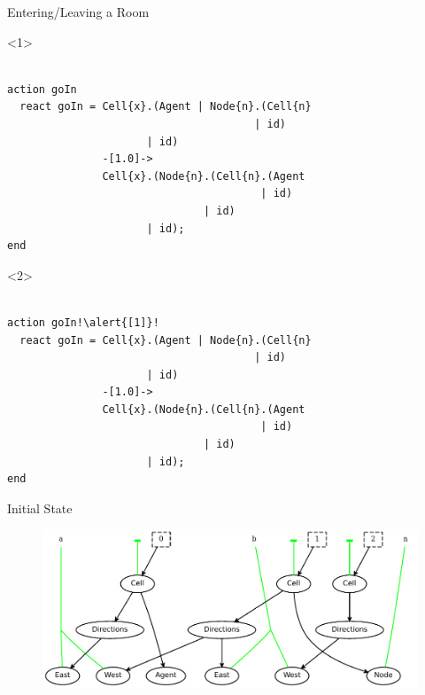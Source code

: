 \documentclass{beamer}
\begin{document}
\begin{frame}[fragile]{Entering/Leaving a Room}
  \begin{onlyenv}<1>
\begin{lstlisting}

action goIn
  react goIn = Cell{x}.(Agent | Node{n}.(Cell{n}
                                       | id)
                      | id)
               -[1.0]->
               Cell{x}.(Node{n}.(Cell{n}.(Agent
                                        | id)
                               | id)
                      | id);
end

\end{lstlisting}
  \end{onlyenv}
  \begin{onlyenv}<2>
\begin{lstlisting}[escapechar=!]

action goIn!\alert{[1]}!
  react goIn = Cell{x}.(Agent | Node{n}.(Cell{n}
                                       | id)
                      | id)
               -[1.0]->
               Cell{x}.(Node{n}.(Cell{n}.(Agent
                                        | id)
                               | id)
                      | id);
end

\end{lstlisting}
  \end{onlyenv}
\end{frame}

\begin{frame}{Initial State}
  \begin{figure}
    \centering
    \includegraphics[width=\textwidth]{../models/agent2/initial.pdf}
  \end{figure}
\end{frame}
\end{document}
